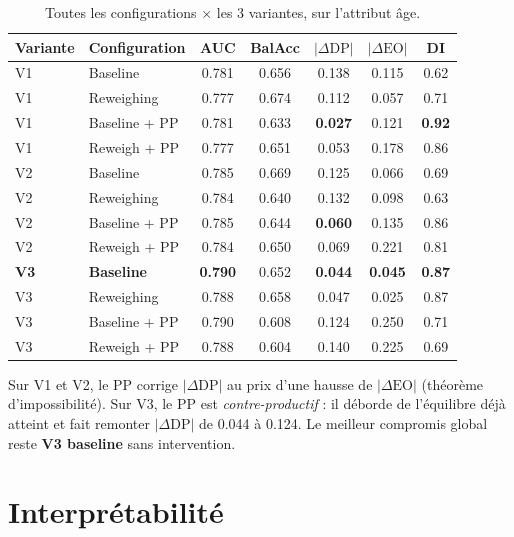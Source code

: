 \documentclass[11pt, a4paper]{article}
\begin{document}
\begin{table}[H]
\centering
\small
\begin{tabular}{llccccc}
\toprule
\textbf{Variante} & \textbf{Configuration} & \textbf{AUC} & \textbf{BalAcc} & $|\Delta\text{DP}|$ & $|\Delta\text{EO}|$ & \textbf{DI} \\
\midrule
V1 & Baseline        & 0.781 & 0.656 & 0.138 & 0.115 & 0.62 \\
V1 & Reweighing      & 0.777 & 0.674 & 0.112 & 0.057 & 0.71 \\
V1 & Baseline + PP   & 0.781 & 0.633 & \textbf{0.027} & 0.121 & \textbf{0.92} \\
V1 & Reweigh + PP    & 0.777 & 0.651 & 0.053 & 0.178 & 0.86 \\
\midrule
V2 & Baseline        & 0.785 & 0.669 & 0.125 & 0.066 & 0.69 \\
V2 & Reweighing      & 0.784 & 0.640 & 0.132 & 0.098 & 0.63 \\
V2 & Baseline + PP   & 0.785 & 0.644 & \textbf{0.060} & 0.135 & 0.86 \\
V2 & Reweigh + PP    & 0.784 & 0.650 & 0.069 & 0.221 & 0.81 \\
\midrule
\textbf{V3} & \textbf{Baseline}        & \textbf{0.790} & 0.652 & \textbf{0.044} & \textbf{0.045} & \textbf{0.87} \\
V3 & Reweighing      & 0.788 & 0.658 & 0.047 & 0.025 & 0.87 \\
V3 & Baseline + PP   & 0.790 & 0.608 & 0.124 & 0.250 & 0.71 \\
V3 & Reweigh + PP    & 0.788 & 0.604 & 0.140 & 0.225 & 0.69 \\
\bottomrule
\end{tabular}
\caption{Toutes les configurations $\times$ les 3 variantes, sur l'attribut âge.}
\end{table}

\begin{leconbox}
Sur V1 et V2, le PP corrige $|\Delta\text{DP}|$ au prix d'une hausse de $|\Delta\text{EO}|$ (théorème d'impossibilité). Sur V3, le PP est \emph{contre-productif} : il déborde de l'équilibre déjà atteint et fait remonter $|\Delta\text{DP}|$ de 0.044 à 0.124. Le meilleur compromis global reste \textbf{V3 baseline} sans intervention.
\end{leconbox}

\section{Interprétabilité}
\end{document}
